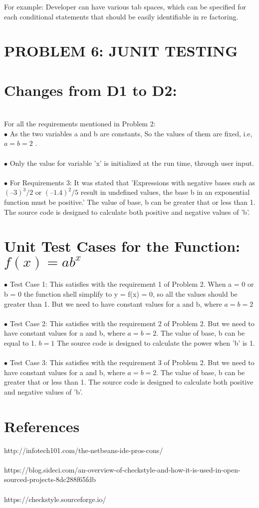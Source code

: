 \documentclass[10pt]{article}
\begin{document}
    For example: Developer can have various tab spaces, which can be specified for each conditional statements that should be easily identifiable in re factoring.

\clearpage

\section*{{PROBLEM 6: JUNIT TESTING}}

 \section *{\normalsize \textbf{ Changes from D1 to D2:}}\\
 
For all the requirements mentioned in Problem 2:\\
$\bullet$ As the two variables a and b are constants, So the values of them are fixed, i.e, $a = b = 2$ .
\\
\\
$\bullet$ Only the value for variable 'x' is initialized at the run time, through user input. 
\\
\\
$\bullet$ For Requirements 3: It was stated that 'Expressions with negative bases such as $(–3)^3/2$  or  $(–1.4)^2/5$ result in undefined values, the base b in an exponential function must be positive.' The value of base, b can be greater that or less than 1. The source code is designed to calculate both positive and negative values of 'b'.


\section*{\normalsize Unit Test Cases for the Function: \( f(x) = ab^x \)}

$\bullet$ Test Case 1: This satisfies with the requirement 1 of Problem 2. When  a = 0  or  b = 0  the function shell simplify to  y = f(x) = 0, so all the values should be greater than 1.
But we need to have constant values for a and b, where $a= b = 2$ 
\\
\\
$\bullet$ Test Case 2: This satisfies with the requirement 2 of Problem 2. But we need to have constant values for a and b, where $a= b = 2$. The value of base, b can be equal to 1. $b=1$ The source code is designed to calculate the power when 'b' is 1.
\\
\\
$\bullet$ Test Case 3: This satisfies with the requirement 3 of Problem 2. But we need to have constant values for a and b, where $a= b = 2$. The value of base, b can be greater that or less than 1. The source code is designed to calculate both positive and negative values of 'b'.

\section*{\normalsize References}

http://infotech101.com/the-netbeans-ide-pros-cons/
\\
\\
https://blog.sideci.com/an-overview-of-checkstyle-and-how-it-is-used-in-open-sourced-projects-8dc288f65fdb
\\
\\
https://checkstyle.sourceforge.io/
\end{document}
